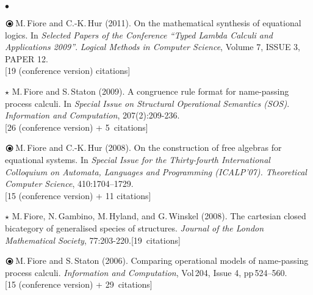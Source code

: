 \documentclass[11pt,twocolumn]{article}
\newenvironment{mybigitemize}
  {\begin{list}{$\bullet$}
  {\setlength{\topsep}{2pt}
   \setlength{\partopsep}{2pt}
   \setlength{\itemsep}{2.5pt}
   \setlength{\parsep}{2.5pt}
   \setlength{\leftmargin}{1em}
   \setlength{\labelwidth}{.5em}}}
  {\end{list}}
\newcommand{\obullet}{\mbox{$\raisebox{-.85mm}{\huge$\circ$}\hspace*{-2.6mm}\bullet$}}
\begin{document}
\begin{mybigitemize}
\item[$\obullet$]
  M.\,Fiore and C.-K.\,Hur (2011).  On the mathematical synthesis of
  equational logics.   In \emph{Selected Papers of the Conference
    ``Typed Lambda Calculi and Applications 2009''}.  \emph{Logical
    Methods in Computer Science}, Volume 7, ISSUE 3, PAPER
  12.\\\mbox{}\hfill{\small[19 (conference version) citations]}


\item[$\star$]
  M.\,Fiore and S.\,Staton (2009).  A congruence rule format for
  name-passing process calculi.  In \emph{Special Issue on Structural
    Operational Semantics (SOS)}. \emph{Information and Computation},
  207(2):209-236.\\\mbox{}\hfill{\small[26 (conference version) + 5~citations]}

\item[$\obullet$]
  M.\,Fiore and C.-K.\,Hur (2008).  On the construction of free
  algebras for equational systems.  In \emph{Special Issue for the
    Thirty-fourth International Colloquium on Automata, Languages and
    Programming (ICALP'07).  Theoretical Computer Science},
  410:1704--1729.\\\mbox{}\hfill{\small[15 (conference version) + 11 citations]}

\item[$\star$]
  M.\,Fiore, N.\,Gambino, M.\,Hyland, and G.\,Winskel (2008).  The
  cartesian closed bicategory of generalised species of structures. 
  \emph{Journal of the London Mathematical Society},
  77:203-220.\mbox{}\hfill{\small[19~citations]}


\item[$\obullet$]
  M.\,Fiore and S.\,Staton (2006).  
  Comparing operational models of
  name-passing process calculi.  \emph{Information and Computation},
  Vol\,204, Issue 4, pp\,524--560.\\\mbox{}\hfill{\small[15 (conference version)
    + 29~citations]}


\end{mybigitemize}
\end{document}
